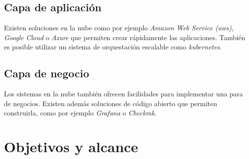 	\subsection{Capa de aplicación}
	\label{artAplicacion}
	
		Existen soluciones en la nube como por ejemplo \emph{Amazon Web Service (aws)}, \emph{Google Cloud} o \emph{Azure} que permiten crear rápidamente las aplicaciones. También es posible utilizar un sistema de orquestación escalable como \emph{kubernetes}.
	
	\subsection{Capa de negocio}
	\label{artNegocio}	
	
		Los sistemas en la nube también ofrecen facilidades para implementar una para de negocios. Existen además soluciones de código abierto que permiten construirla, como por ejemplo \emph{Grafana} o \emph{Checkmk}.

\section{Objetivos y alcance}
\label{objetivos}
